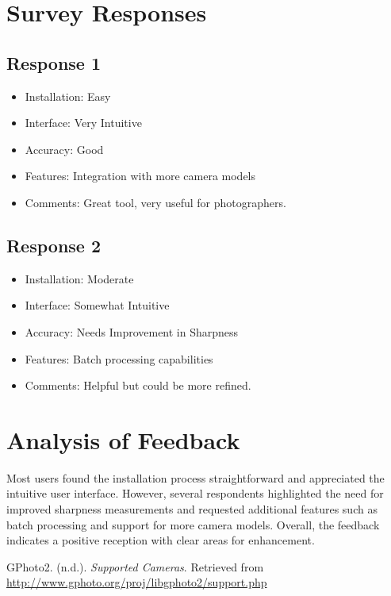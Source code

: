 \section{Survey Responses}
\subsection{Response 1}
\begin{itemize}
    \item Installation: Easy
    \item Interface: Very Intuitive
    \item Accuracy: Good
    \item Features: Integration with more camera models
    \item Comments: Great tool, very useful for photographers.
\end{itemize}

\subsection{Response 2}
\begin{itemize}
    \item Installation: Moderate
    \item Interface: Somewhat Intuitive
    \item Accuracy: Needs Improvement in Sharpness
    \item Features: Batch processing capabilities
    \item Comments: Helpful but could be more refined.
\end{itemize}


\section{Analysis of Feedback}
Most users found the installation process straightforward and appreciated the intuitive user interface. However, several respondents highlighted the need for improved sharpness measurements and requested additional features such as batch processing and support for more camera models. Overall, the feedback indicates a positive reception with clear areas for enhancement.

\backmatter

\begin{thebibliography}{9}
GPhoto2. (n.d.). \textit{Supported Cameras}. Retrieved from \url{http://www.gphoto.org/proj/libgphoto2/support.php}

\end{thebibliography}


